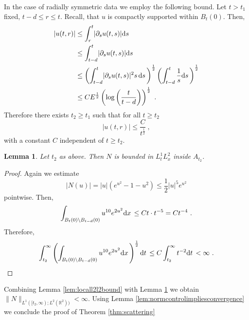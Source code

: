 \documentclass[a4paper]{amsart}
\newtheorem{lemma}[thm]{Lemma}
\providecommand{\abs}[1]{\lvert #1 \rvert}
\providecommand{\dint}[1]{ {\rm d} #1\,}
\providecommand{\norm}[1]{\lVert #1 \rVert}
\begin{document}
In the case of radially symmetric data we employ the following bound.
Let $t > t_1$ fixed, $t - d \leq r \leq t$. Recall, that $u$ is
compactly supported within $B_t(0)$. Then,
\begin{equation*}
  \begin{split}
    \abs{u(t, r)}
    &\leq
    \int_{r}^{t}
    \abs{\partial_s u(t, s)}
    \dint{s}
    \\
    &\leq
    \int_{t - d}^{t}
    \abs{\partial_s u(t, s)}
    \dint{s}
    \\
    &\leq
    \left(
      \int_{t - d}^{t}
      \abs{\partial_s u(t, s)}^2
      s\,
      \dint{s}
    \right)^{\frac{1}{2}}
    \left(
      \int_{t - d}^{t}
      \frac{1}{s}
      \dint{s}
    \right)^{\frac{1}{2}}
    \\
    &\leq
    C E^{\frac{1}{2}}
    \left(
      \log
      \left(
        \frac{t}{t - d}
      \right)
    \right)^{\frac{1}{2}}
    \ .
  \end{split}
\end{equation*}
Therefore there exists $t_2 \geq t_1$ such that for all $t \geq t_2$
\begin{equation*}
  \abs{u(t, r)}
  \leq
  \frac{C}{t^{\frac{1}{2}}}
  \ ,
\end{equation*}
with a constant $C$ independent of $t \geq t_2$.
\begin{lemma}
  Let $t_2$ as above. Then $N$ is bounded in $L_t^1 L_x^2$ inside $A_{t_2}$.
  \label{lem:finitel1l2inannulus}
\end{lemma}
\begin{proof}
  Again we estimate
  \begin{equation*}
    \lvert
    N(u)
    \lvert
    =
    \lvert
    u
    \rvert
    (e^{u^2} - 1 - u^2)
    \leq
    \frac{1}{2}
    \lvert u \rvert^5 e^{u^2}
  \end{equation*}
  pointwise. Then,
  \begin{equation*}
    \int_{B_t(0) \setminus B_{t - d}(0)}
    u^{10} e^{2 u^2}
    \dint{x}
    \leq
    C t \cdot t^{-5}
    =
    C t^{-4}
    \ .
  \end{equation*}
  Therefore,
  \begin{equation*}
    \int_{t_2}^\infty
    \left(
      \int_{B_t(0) \setminus B_{t - d}(0)}
      u^{10} e^{2 u^2}
      \dint{x}
    \right)^{\frac{1}{2}}
    \dint{t}
    \leq
    C
    \int_{t_2}^\infty
    t^{-2}
    \dint{t}
    <
    \infty
    \ .
  \end{equation*}
\end{proof}
Combining Lemma \ref{lem:locall2l2bound} with Lemma
\ref{lem:finitel1l2inannulus} we obtain $\norm{N}_{L^1([t_2, \infty);
  L^2(\mathbb{R}^2))} < \infty$. Using Lemma
\ref{lem:normcontrolimpliesconvergence} we conclude the proof of
Theorem \ref{thm:scattering}



\end{document}
